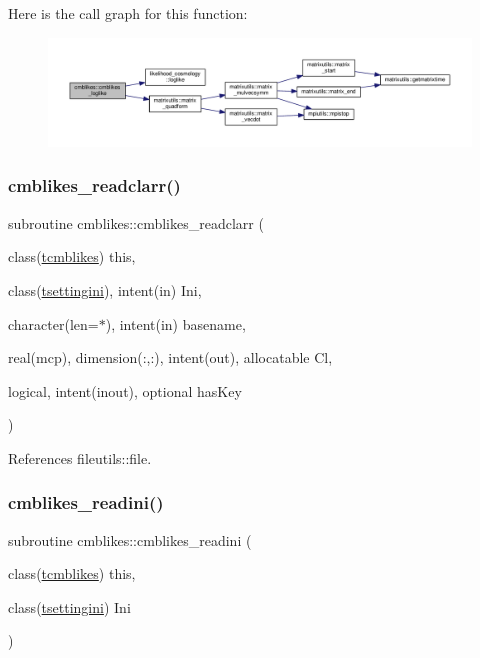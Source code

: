 Here is the call graph for this function\+:
\nopagebreak
\begin{figure}[H]
\begin{center}
\leavevmode
\includegraphics[width=350pt]{namespacecmblikes_a97fb12e9b7c8a1059a8443b1b0423c24_cgraph}
\end{center}
\end{figure}
\mbox{\label{namespacecmblikes_ae22eb6439b51b993d560298fa0c2ebd8}} 
\subsubsection{\texorpdfstring{cmblikes\+\_\+readclarr()}{cmblikes\_readclarr()}}
{\footnotesize\ttfamily subroutine cmblikes\+::cmblikes\+\_\+readclarr (\begin{DoxyParamCaption}\item[{class(\mbox{\hyperlink{structcmblikes_1_1tcmblikes}{tcmblikes}})}]{this,  }\item[{class(\mbox{\hyperlink{structsettings_1_1tsettingini}{tsettingini}}), intent(in)}]{Ini,  }\item[{character(len=$\ast$), intent(in)}]{basename,  }\item[{real(mcp), dimension(\+:,\+:), intent(out), allocatable}]{Cl,  }\item[{logical, intent(inout), optional}]{has\+Key }\end{DoxyParamCaption})\hspace{0.3cm}{\ttfamily [private]}}



References fileutils\+::file.

\mbox{\label{namespacecmblikes_a0a856ee69d8586f1b224e56f86016346}} 
\subsubsection{\texorpdfstring{cmblikes\+\_\+readini()}{cmblikes\_readini()}}
{\footnotesize\ttfamily subroutine cmblikes\+::cmblikes\+\_\+readini (\begin{DoxyParamCaption}\item[{class(\mbox{\hyperlink{structcmblikes_1_1tcmblikes}{tcmblikes}})}]{this,  }\item[{class(\mbox{\hyperlink{structsettings_1_1tsettingini}{tsettingini}})}]{Ini }\end{DoxyParamCaption})\hspace{0.3cm}{\ttfamily [private]}}




